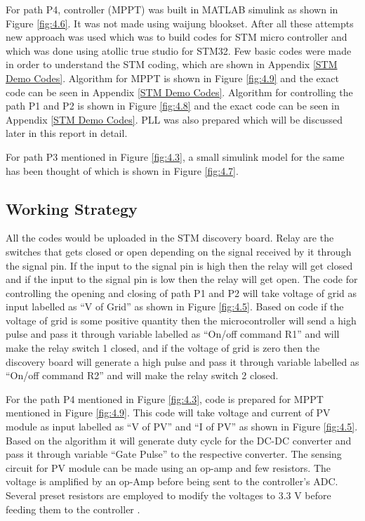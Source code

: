 \documentclass[a4paper,12pt]{iitmdiss}
\begin{document}
For path P4, controller (MPPT) was built in MATLAB simulink as shown in Figure \ref{fig:4.6}. It was not made using waijung blookset. After all these attempts new approach was used which was to build codes for STM micro controller and which was done using atollic true studio for STM32. Few basic codes were made in order to understand the STM coding, which are shown in Appendix \ref{STM Demo Codes}. Algorithm for MPPT is shown in Figure \ref{fig:4.9} and the exact code can be seen in Appendix \ref{STM Demo Codes}. Algorithm for controlling the path P1 and P2 is shown in Figure \ref{fig:4.8} and the exact code can be seen in Appendix \ref{STM Demo Codes}. PLL was also prepared which will be discussed later in this report in detail.

For path P3 mentioned in Figure \ref{fig:4.3}, a small simulink model for the same has been thought of which is shown in Figure \ref{fig:4.7}.

\subsection{Working Strategy}
All the codes would be uploaded in the STM discovery board. Relay are the switches that gets closed or open depending on the signal received by it through the signal pin. If the input to the signal pin is high then the relay will get closed and if the input to the signal pin is low then the relay will get open. The code for controlling the opening and closing of path P1 and P2 will take voltage of grid as input labelled as \enquote{V of Grid} as shown in Figure \ref{fig:4.5}. Based on code if the voltage of grid is some positive quantity then the microcontroller will send a high pulse and pass it through variable labelled as \enquote{On/off command R1} and will make the relay switch 1 closed, and if the voltage of grid is zero then the discovery board will generate a high pulse and pass it through variable labelled as \enquote{On/off command R2} and will make the relay switch 2 closed.

For the path P4 mentioned in Figure \ref{fig:4.3}, code is prepared for MPPT mentioned in Figure \ref{fig:4.9}. This code will take voltage and current of PV module as input labelled as \enquote{V of PV} and \enquote{I of PV} as shown in Figure \ref{fig:4.5}. Based on the algorithm it will generate duty cycle for the DC-DC converter and pass it through variable \enquote{Gate Pulse} to the respective converter. The sensing circuit for PV module can be made using an op-amp and few resistors. The voltage is amplified by an op-Amp before being sent to the controller's ADC. Several preset resistors are employed to modify the voltages to 3.3 V before feeding them to the controller \textcolor{blue}{\cite{tamkoriadesign}}.
\end{document}
